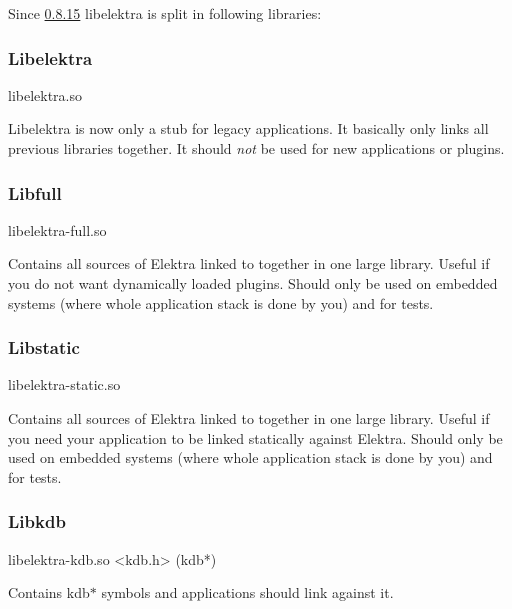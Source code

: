 Since \hyperlink{doc_decisions_library_split_md}{0.8.15} libelektra is split in following libraries\+:

 \subsubsection*{Libelektra}

\begin{DoxyVerb}libelektra.so
\end{DoxyVerb}


Libelektra is now only a stub for legacy applications. It basically only links all previous libraries together. It should {\itshape not} be used for new applications or plugins.

\subsubsection*{Libfull}

\begin{DoxyVerb}libelektra-full.so
\end{DoxyVerb}


Contains all sources of Elektra linked to together in one large library. Useful if you do not want dynamically loaded plugins. Should only be used on embedded systems (where whole application stack is done by you) and for tests.

\subsubsection*{Libstatic}

\begin{DoxyVerb}libelektra-static.so
\end{DoxyVerb}


Contains all sources of Elektra linked to together in one large library. Useful if you need your application to be linked statically against Elektra. Should only be used on embedded systems (where whole application stack is done by you) and for tests.

\subsubsection*{Libkdb}

\begin{DoxyVerb}libelektra-kdb.so
<kdb.h> (kdb*)
\end{DoxyVerb}


Contains kdb$\ast$ symbols and applications should link against it.

